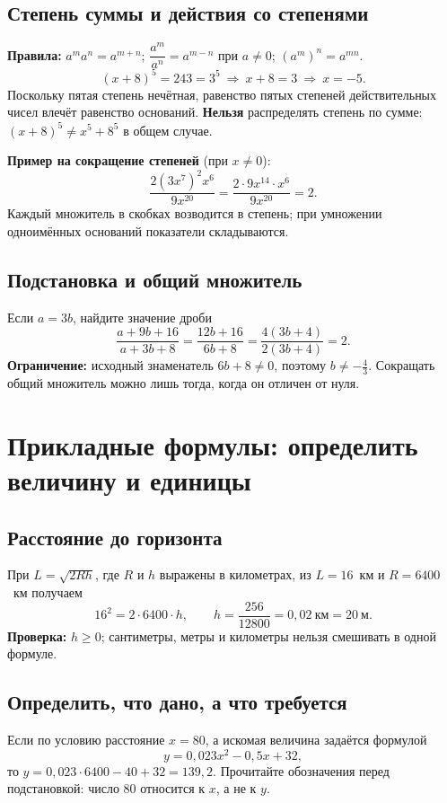 \documentclass[a4paper,12pt]{article}
\newcommand{\key}[1]{\textbf{\color{darkaccent}#1}}
\begin{document}
\subsection{Степень суммы и действия со степенями}
\key{Правила:} $a^m a^n=a^{m+n}$; $\dfrac{a^m}{a^n}=a^{m-n}$ при $a\ne0$; $(a^m)^n=a^{mn}$.
\[
(x+8)^5=243=3^5\ \Longrightarrow\ x+8=3\ \Longrightarrow\ \boxed{x=-5}.
\]
Поскольку пятая степень нечётная, равенство пятых степеней действительных чисел влечёт равенство оснований. \key{Нельзя} распределять степень по сумме: $(x+8)^5\ne x^5+8^5$ в общем случае.

\key{Пример на сокращение степеней} (при $x\ne0$):
\[
\frac{2(3x^7)^2x^6}{9x^{20}}
=\frac{2\cdot9x^{14}\cdot x^6}{9x^{20}}=\boxed{2}.
\]
Каждый множитель в скобках возводится в степень; при умножении одноимённых оснований показатели складываются.

\subsection{Подстановка и общий множитель}
Если $a=3b$, найдите значение дроби
\[
\frac{a+9b+16}{a+3b+8}
=\frac{12b+16}{6b+8}
=\frac{4(3b+4)}{2(3b+4)}=\boxed{2}.
\]
\key{Ограничение:} исходный знаменатель $6b+8\ne0$, поэтому $b\ne-\frac43$. Сокращать общий множитель можно лишь тогда, когда он отличен от нуля.

\clearpage
\section{Прикладные формулы: определить величину и единицы}
\subsection{Расстояние до горизонта}
При $L=\sqrt{2Rh}$, где $R$ и $h$ выражены в километрах, из $L=16$~км и $R=6400$~км получаем
\[
16^2=2\cdot6400\cdot h,\qquad h=\frac{256}{12800}=0{,}02\ \text{км}=\boxed{20\ \text{м}}.
\]
\key{Проверка:} $h\ge0$; сантиметры, метры и километры нельзя смешивать в одной формуле.

\subsection{Определить, что дано, а что требуется}
Если по условию расстояние $x=80$, а искомая величина задаётся формулой
\[
y=0{,}023x^2-0{,}5x+32,
\]
то \(y=0{,}023\cdot6400-40+32=\boxed{139{,}2}\). Прочитайте обозначения перед подстановкой: число $80$ относится к $x$, а не к $y$.
\end{document}
